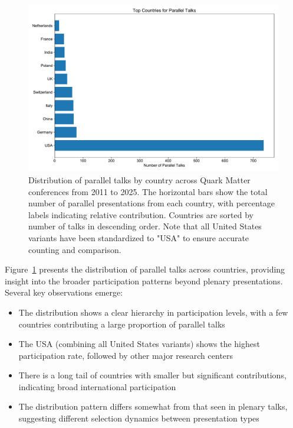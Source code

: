 \documentclass[a4paper,11pt]{article}
\begin{document}
\begin{figure}[H]
\centering
\includegraphics[width=\textwidth]{figures/parallel_talks_by_country.pdf}
\caption{Distribution of parallel talks by country across Quark Matter conferences from 2011 to 2025. The horizontal bars show the total number of parallel presentations from each country, with percentage labels indicating relative contribution. Countries are sorted by number of talks in descending order. Note that all United States variants have been standardized to "USA" to ensure accurate counting and comparison.}
\label{fig:parallel_talks}
\end{figure}

Figure~\ref{fig:parallel_talks} presents the distribution of parallel talks across countries, providing insight into the broader participation patterns beyond plenary presentations. Several key observations emerge:

\begin{itemize}
    \item The distribution shows a clear hierarchy in participation levels, with a few countries contributing a large proportion of parallel talks
    \item The USA (combining all United States variants) shows the highest participation rate, followed by other major research centers
    \item There is a long tail of countries with smaller but significant contributions, indicating broad international participation
    \item The distribution pattern differs somewhat from that seen in plenary talks, suggesting different selection dynamics between presentation types
\end{itemize}
\end{document}
